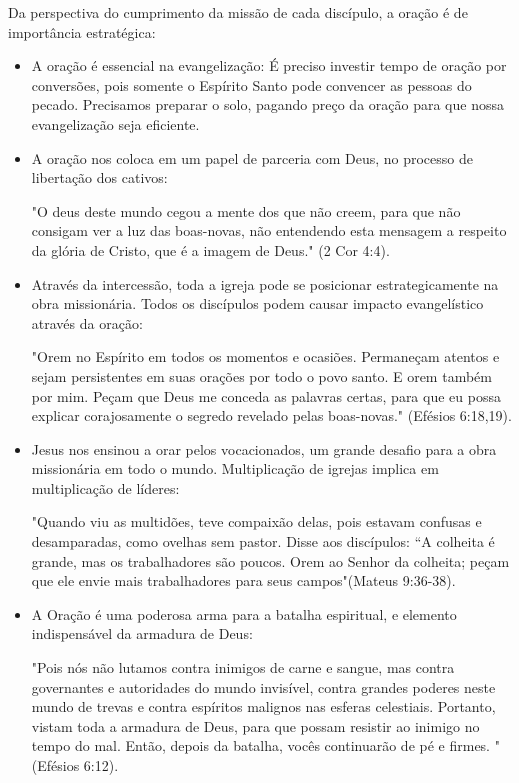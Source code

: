 \documentclass[12pt,openright,oneside,a4paper]{abntex2}
\begin{document}
  Da perspectiva do cumprimento da missão de cada discípulo, a oração é de importância estratégica:

  \begin{itemize}
	\item A oração é essencial na evangelização: É preciso investir tempo de oração por conversões, pois somente o Espírito Santo pode convencer as pessoas do pecado. Precisamos preparar o solo, pagando preço da oração para que nossa evangelização seja eficiente.
	\item A oração nos coloca em um papel de parceria com Deus, no processo de libertação dos cativos: \begin{citacao}"O deus deste mundo cegou a mente dos que não creem, para que não consigam ver a luz das boas-novas, não entendendo esta mensagem a respeito da glória de Cristo, que é a imagem de Deus." (2 Cor 4:4).\end{citacao}
	\item Através da intercessão, toda a igreja pode se posicionar estrategicamente na obra missionária. Todos os discípulos podem causar impacto evangelístico através da oração: \begin{citacao}"Orem no Espírito em todos os momentos e ocasiões. Permaneçam atentos e sejam persistentes em suas orações por todo o povo santo. E orem também por mim. Peçam que Deus me conceda as palavras certas, para que eu possa explicar corajosamente o segredo revelado pelas boas-novas." (Efésios 6:18,19).\end{citacao}
	\item Jesus nos ensinou a orar pelos vocacionados, um grande desafio para a obra missionária em todo o mundo. Multiplicação de igrejas implica em multiplicação de líderes: \begin{citacao}"Quando viu as multidões, teve compaixão delas, pois estavam confusas e desamparadas, como ovelhas sem pastor. Disse aos discípulos: “A colheita é grande, mas os trabalhadores são poucos. Orem ao Senhor da colheita; peçam que ele envie mais trabalhadores para seus campos"(Mateus 9:36-38).\end{citacao}
	\item A Oração é uma poderosa arma para a batalha espiritual, e elemento indispensável da armadura de Deus: \begin{citacao}"Pois nós não lutamos contra inimigos de carne e sangue, mas contra governantes e autoridades do mundo invisível, contra grandes poderes neste mundo de trevas e contra espíritos malignos nas esferas celestiais. Portanto, vistam toda a armadura de Deus, para que possam resistir ao inimigo no tempo do mal. Então, depois da batalha, vocês continuarão de pé e firmes. "(Efésios 6:12).\end{citacao}
  
	\cite[p. 32-34]{brandao}
\end{itemize}
\end{document}
